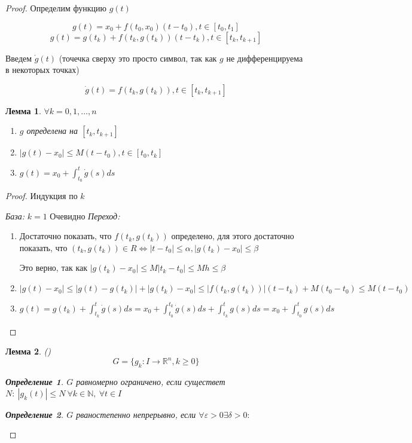 \documentclass[a4paper]{article}
\theoremstyle{indented}
\newtheorem*{lemma}{Лемма}
\theoremstyle{definition}
\newtheorem*{defn}{Определение}
\theoremstyle{remark}
\begin{document}
\begin{proof}
  Определим функцию $g(t)$

  \[g(t) = x_0 + f(t_0,x_0)(t-t_0),  t \in [t_0,t_1]\]
  \[g(t) = g(t_k) + f(t_k,g(t_k))(t-t_k), t \in [t_k,t_{k+1}]\]

  Введем $\dot g(t)$ (точечка сверху это просто символ, так как $g$ не дифференцируема в некоторых точках)

  \[\dot g(t) = f(t_k,g(t_k)), t \in [t_k,t_{k+1}]\]

  \begin{lemma}
    $\forall k = 0,1, \ldots, n$
    \begin{enumerate}
    \item $g$ определена на $[t_k, t_{k+1}]$
    \item $|g(t)- x_0| \leqslant M(t-t_0), t \in [t_0,t_k]$
    \item $g(t) =  x_0 + \int_{t_0}^{t}\dot g(s)ds$
    \end{enumerate}
  \end{lemma}
  \begin{proof}
    Индукция по $k$

    \textit{База:} $k = 1$ Очевидно
    \textit{Переход:}
    \begin{enumerate}
    \item Достаточно показать, что $f(t_k,g(t_k))$ определено, для этого достаточно показать, что $(t_k,g(t_k)) \in R \Leftrightarrow |t-t_0|\leqslant \alpha, |g(t_k)-x_0 | \leqslant \beta$

      Это верно, так как $|g(t_k) - x_0| \leqslant M |t_k - t_0| \leqslant Mh \leqslant \beta$
    \item $|g(t) - x_0| \leqslant |g(t) - g(t_k)| + |g(t_k) - x_0| \leqslant |f(t_k,g(t_k))|(t-t_k) + M(t_0 - t_0) \leqslant M(t-t_0)$
    \item $g(t) = g(t_k) + \int_{t_k}^{t}\dot g(s)ds =  x_0 + \int_{t_0}^{t_k}\dot g(s)ds + \int_{t_k}^{t}g(s)ds = x_0 + \int_{t_0}^{t}g(s)ds$
    \end{enumerate}
  \end{proof}

  \begin{lemma}
    ()
    \[G = \{g_k : I \to \mathbb{R}^n, k \geqslant 0\}\]

    \begin{defn}
      $G$ равномерно ограничено, если существет $N: \ |g_k(t)| \leqslant N \ \forall k \in  \mathbb{N}, \ \forall t \in  I$
    \end{defn}
    \begin{defn}
      $G$ рваностепенно непрерывно, если $\forall \varepsilon > 0 \exists \delta > 0:$


\end{defn}
\end{lemma}
\end{proof}
\end{document}
